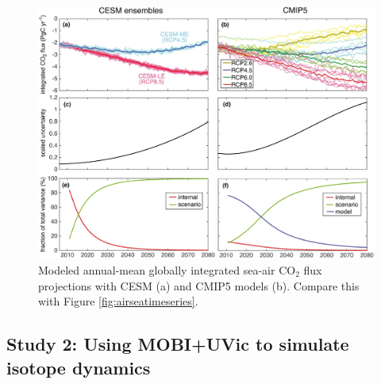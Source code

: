 \documentclass[a4paper]{article}
\begin{document}
\begin{enumerate}
\begin{figure}[H]   %
   \centering
   \includegraphics[trim=0 760 0 0,clip,scale=0.3]{Lovenduski16_GBC_Fig2.jpg}
   \caption[]{Modeled annual-mean globally integrated sea-air $\mathrm{CO_2}$ flux projections \citep[from][]{Lovenduski16} with CESM (a) and CMIP5 models (b). Compare this with Figure \ref{fig:airseatimeseries}.}
   \label{fig:airseatimeseries_cmip5}
\end{figure}

\end{enumerate}

\subsection{Study 2: Using MOBI+UVic to simulate isotope dynamics}
\end{document}
